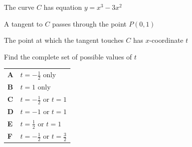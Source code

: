 \documentclass[11pt,a4paper]{article}
\begin{document}
\begin{enumerate}[label=\textbf{\arabic*.},leftmargin=*,itemsep=0pt,start=3]
\questionitem[Polynomials]
The curve $C$ has equation $y=x^3-3x^2$

A tangent to $C$ passes through the point $P(0,1)$

The point at which the tangent touches $C$ has $x$-coordinate $t$

Find the complete set of possible values of $t$

\par\vspace*{12pt}
\begin{tabularx}{\linewidth}{@{}>{\bfseries}l Y@{}}
A &
$t=-\frac12$ only
\\[0.8em]
B &
$t=1$ only
\\[0.8em]
C &
$t=-\frac12$ or $t=1$
\\[0.8em]
D &
$t=-1$ or $t=1$
\\[0.8em]
E &
$t=\frac12$ or $t=1$
\\[0.8em]
F &
$t=-\frac12$ or $t=\frac32$
\\
\end{tabularx}
\end{enumerate}
\clearpage
\thispagestyle{djspaper}
\vspace*{8pt}
\end{document}
